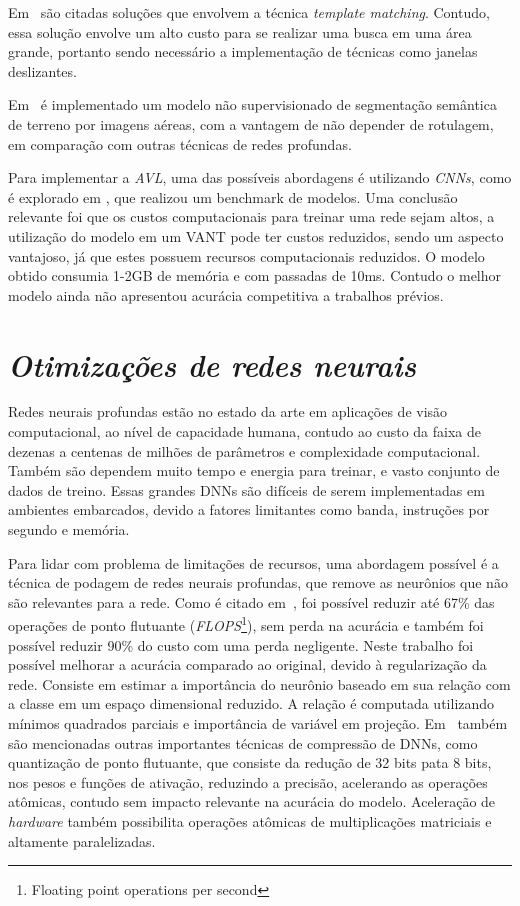 Em~\cite{COUTURIER2021103666} são citadas soluções que envolvem a técnica \textit{template matching}. Contudo, essa solução envolve um alto custo para se realizar uma busca em uma área grande, portanto sendo necessário a implementação de técnicas como janelas deslizantes. 

Em~\cite{9552597} é implementado um modelo não supervisionado de segmentação semântica de terreno por imagens aéreas, com a vantagem de não depender de rotulagem, em comparação com outras técnicas de redes profundas.

Para implementar a \textit{AVL}, uma das possíveis abordagens é utilizando \textit{CNNs}, como é explorado em \cite{rs13194017}, que realizou um benchmark de modelos. Uma conclusão relevante foi que os custos computacionais para treinar uma rede sejam altos, a utilização do modelo em um VANT pode ter custos reduzidos, sendo um aspecto vantajoso, já que estes possuem recursos computacionais reduzidos. O modelo obtido consumia 1-2GB de memória e com passadas de 10ms. Contudo o melhor modelo ainda não apresentou acurácia competitiva a trabalhos prévios.




\section{\textit{Otimizações de redes neurais}}\label{sec:Cap2_compressao}


Redes neurais profundas estão no estado da arte em aplicações de visão computacional, ao nível de capacidade humana, contudo ao custo da faixa de dezenas a centenas de milhões de parâmetros e complexidade computacional. Também são dependem muito tempo e energia para treinar, e vasto conjunto de dados de treino. Essas grandes DNNs são difíceis de serem implementadas em ambientes embarcados, devido a fatores limitantes como banda, instruções por segundo e memória. 

Para lidar com problema de limitações de recursos, uma abordagem possível é a técnica de podagem de redes neurais profundas, que remove as neurônios que não são relevantes para a rede. Como é citado em~\cite{jordao2019pruning}, foi possível reduzir até 67\% das operações de ponto flutuante (\textit{FLOPS}\footnote{Floating point operations per second }), sem perda na acurácia e também foi possível reduzir 90\% do custo com uma perda negligente. Neste trabalho foi possível melhorar a acurácia comparado ao original, devido à regularização da rede. Consiste em estimar a importância do neurônio baseado em sua relação com a classe em um espaço dimensional reduzido. A relação é computada utilizando mínimos quadrados parciais e importância de variável em projeção. Em~\cite{liang2021pruning} também são mencionadas outras importantes técnicas de compressão de DNNs, como quantização de ponto flutuante, que consiste da redução de 32 bits pata 8 bits, nos pesos e funções de ativação, reduzindo a precisão, acelerando as operações atômicas, contudo sem impacto relevante na acurácia do modelo. Aceleração de \textit{hardware} também possibilita operações atômicas de multiplicações matriciais e altamente paralelizadas. 

